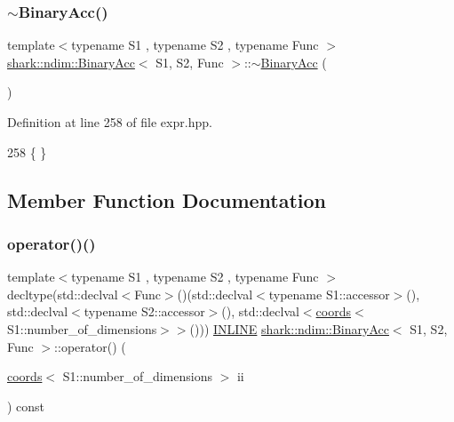 \subsubsection{\texorpdfstring{$\sim$\+Binary\+Acc()}{~BinaryAcc()}}
{\footnotesize\ttfamily template$<$typename S1 , typename S2 , typename Func $>$ \\
\hyperlink{classshark_1_1ndim_1_1_binary_acc}{shark\+::ndim\+::\+Binary\+Acc}$<$ S1, S2, Func $>$\+::$\sim$\hyperlink{classshark_1_1ndim_1_1_binary_acc}{Binary\+Acc} (\begin{DoxyParamCaption}{ }\end{DoxyParamCaption})}



Definition at line 258 of file expr.\+hpp.


\begin{DoxyCode}
258 \{ \}
\end{DoxyCode}


\subsection{Member Function Documentation}
\hypertarget{classshark_1_1ndim_1_1_binary_acc_a61bcee2ed74f523bb95a2525b522d6fb}{}\label{classshark_1_1ndim_1_1_binary_acc_a61bcee2ed74f523bb95a2525b522d6fb} 
\subsubsection{\texorpdfstring{operator()()}{operator()()}}
{\footnotesize\ttfamily template$<$typename S1 , typename S2 , typename Func $>$ \\
decltype(std\+::declval$<$Func$>$()(std\+::declval$<$typename S1\+::accessor$>$(), std\+::declval$<$typename S2\+::accessor$>$(), std\+::declval$<$\hyperlink{structshark_1_1ndim_1_1coords}{coords}$<$S1\+::number\+\_\+of\+\_\+dimensions$>$$>$())) \hyperlink{common_8hpp_a2eb6f9e0395b47b8d5e3eeae4fe0c116}{I\+N\+L\+I\+NE} \hyperlink{classshark_1_1ndim_1_1_binary_acc}{shark\+::ndim\+::\+Binary\+Acc}$<$ S1, S2, Func $>$\+::operator() (\begin{DoxyParamCaption}\item[{\hyperlink{structshark_1_1ndim_1_1coords}{coords}$<$ S1\+::number\+\_\+of\+\_\+dimensions $>$}]{ii }\end{DoxyParamCaption}) const}



